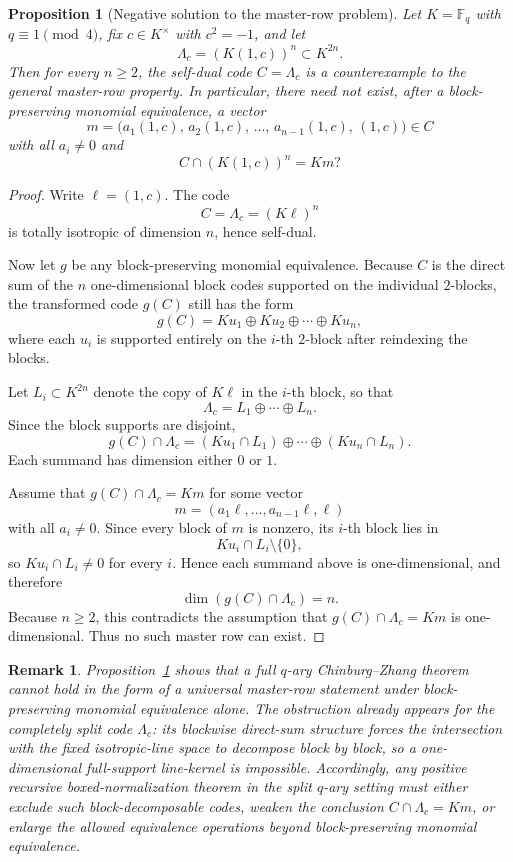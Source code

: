 \documentclass[12pt]{article}
\newtheorem{prop}[theorem]{Proposition}
\newtheorem{remark}[theorem]{Remark}
\newcommand{\F}{\mathbb{F}}
\begin{document}
\begin{prop}[Negative solution to the master-row problem]
\label{prop:negative-master-row}
Let \(K=\F_q\) with \(q\equiv 1 \pmod 4\), fix \(c\in K^\times\) with \(c^2=-1\), and let
\[
\Lambda_c=(K(1,c))^n \subset K^{2n}.
\]
Then for every \(n\ge 2\), the self-dual code \(C=\Lambda_c\) is a counterexample to the general master-row property. In particular, there need not exist, after a block-preserving monomial equivalence, a vector
\[
m=\bigl(a_1(1,c),\,a_2(1,c),\,\dots,\,a_{n-1}(1,c),\,(1,c)\bigr)\in C
\]
with all \(a_i\neq 0\) and
\[
C\cap (K(1,c))^n = K m?
\]
\end{prop}

\begin{proof}
Write \(\ell=(1,c)\). The code
\[
C=\Lambda_c=(K\ell)^n
\]
is totally isotropic of dimension \(n\), hence self-dual.

Now let \(g\) be any block-preserving monomial equivalence. Because \(C\) is the direct sum of the \(n\) one-dimensional block codes supported on the individual \(2\)-blocks, the transformed code \(g(C)\) still has the form
\[
g(C)=K u_1 \oplus K u_2 \oplus \cdots \oplus K u_n,
\]
where each \(u_i\) is supported entirely on the \(i\)-th \(2\)-block after reindexing the blocks.

Let \(L_i\subset K^{2n}\) denote the copy of \(K\ell\) in the \(i\)-th block, so that
\[
\Lambda_c=L_1\oplus\cdots\oplus L_n.
\]
Since the block supports are disjoint,
\[
g(C)\cap \Lambda_c
=
(Ku_1\cap L_1)\oplus\cdots\oplus (Ku_n\cap L_n).
\]
Each summand has dimension either \(0\) or \(1\).

Assume that \(g(C)\cap \Lambda_c=Km\) for some vector
\[
m=(a_1\ell,\dots,a_{n-1}\ell,\ell)
\]
with all \(a_i\neq 0\). Since every block of \(m\) is nonzero, its \(i\)-th block lies in
\[
Ku_i\cap L_i\setminus\{0\},
\]
so \(Ku_i\cap L_i\neq 0\) for every \(i\). Hence each summand above is one-dimensional, and therefore
\[
\dim(g(C)\cap \Lambda_c)=n.
\]
Because \(n\ge 2\), this contradicts the assumption that \(g(C)\cap \Lambda_c=Km\) is one-dimensional. Thus no such master row can exist.
\end{proof}

\begin{remark}
\rm
Proposition~\ref{prop:negative-master-row} shows that a full \(q\)-ary Chinburg--Zhang theorem cannot hold in the form of a universal master-row statement under block-preserving monomial equivalence alone. The obstruction already appears for the completely split code \(\Lambda_c\): its blockwise direct-sum structure forces the intersection with the fixed isotropic-line space to decompose block by block, so a one-dimensional full-support line-kernel is impossible. Accordingly, any positive recursive boxed-normalization theorem in the split \(q\)-ary setting must either exclude such block-decomposable codes, weaken the conclusion \(C\cap\Lambda_c=Km\), or enlarge the allowed equivalence operations beyond block-preserving monomial equivalence.
\end{remark}
\end{document}
